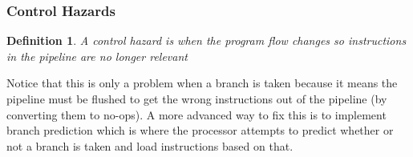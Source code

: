 \documentclass{article}
\newtheorem{definition}{Definition}
\begin{document}
\subsubsection{Control Hazards}
\begin{definition}
    A control hazard is when the program flow changes so instructions in the pipeline are no longer relevant
\end{definition}
Notice that this is only a problem when a branch is taken because it means the pipeline must be flushed to get the wrong instructions out of the pipeline (by converting them to no-ops).
A more advanced way to fix this is to implement branch prediction which is where the processor attempts to predict whether or not a branch is taken and load instructions based on that.
\end{document}
